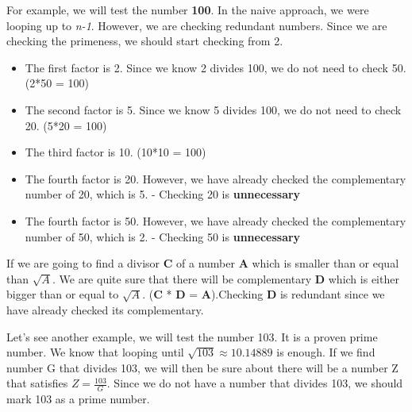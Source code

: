 \documentclass[12pt]{article}
\begin{document}
For example, we will test the number \textbf{100}. In the naive approach, we were looping up to \textit{n-1}. However, we are checking redundant numbers. Since we are checking the primeness, we should start checking from 2.
\begin{itemize}
  \item The first factor is 2. Since we know 2 divides 100, we do not need to check 50. (2*50 = 100)
  \item The second factor is 5. Since we know 5 divides 100, we do not need to check 20. (5*20 = 100)
  \item The third factor is 10. (10*10 = 100) 
  \item The fourth factor is 20. However, we have already checked the complementary number of 20, which is 5. - Checking 20 is \textbf{unnecessary}
  \item The fourth factor is 50. However, we have already checked the complementary number of 50, which is 2. - Checking 50 is \textbf{unnecessary}
\end{itemize}

If we are going to find a divisor \textbf{C} of a number \textbf{A} which is smaller than or equal than $\sqrt{A}$. We are quite sure that there will be complementary \textbf{D} which is either bigger than or equal to $\sqrt{A}$. (\textbf{C} * \textbf{D} = \textbf{A}).Checking \textbf{D} is redundant since we have already checked its complementary.

Let's see another example, we will test the number 103. It is a proven prime number. We know that looping until $ \sqrt{103} \approx 10.14889 $ is enough. If we find number G that divides 103, we will then be sure about there will be a number Z that satisfies $Z = \frac{103}{G}$. Since we do not have a number that divides 103, we should mark 103 as a prime number.

\clearpage
\end{document}
